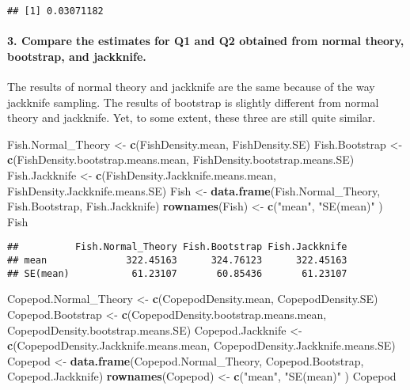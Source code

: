 \documentclass[]{article}
\newenvironment{Shaded}{\begin{snugshade}}{\end{snugshade}}
\newcommand{\KeywordTok}[1]{\textcolor[rgb]{0.13,0.29,0.53}{\textbf{{#1}}}}
\newcommand{\StringTok}[1]{\textcolor[rgb]{0.31,0.60,0.02}{{#1}}}
\newcommand{\NormalTok}[1]{{#1}}
\let\oldparagraph\paragraph
\renewcommand{\paragraph}[1]{\oldparagraph{#1}\mbox{}}
\begin{document}
\begin{verbatim}
## [1] 0.03071182
\end{verbatim}

\paragraph{3. Compare the estimates for Q1 and Q2 obtained from normal
theory, bootstrap, and
jackknife.}\label{compare-the-estimates-for-q1-and-q2-obtained-from-normal-theory-bootstrap-and-jackknife.}

The results of normal theory and jackknife are the same because of the
way jackknife sampling. The results of bootstrap is slightly different
from normal theory and jackknife. Yet, to some extent, these three are
still quite similar.

\begin{Shaded}
\begin{Highlighting}[]
\NormalTok{Fish.Normal_Theory <-}\StringTok{ }\KeywordTok{c}\NormalTok{(FishDensity.mean, FishDensity.SE)}
\NormalTok{Fish.Bootstrap <-}\StringTok{ }\KeywordTok{c}\NormalTok{(FishDensity.bootstrap.means.mean, FishDensity.bootstrap.means.SE)}
\NormalTok{Fish.Jackknife <-}\StringTok{ }\KeywordTok{c}\NormalTok{(FishDensity.Jackknife.means.mean, FishDensity.Jackknife.means.SE)}
\NormalTok{Fish <-}\StringTok{ }\KeywordTok{data.frame}\NormalTok{(Fish.Normal_Theory, Fish.Bootstrap, Fish.Jackknife)}
\KeywordTok{rownames}\NormalTok{(Fish) <-}\StringTok{ }\KeywordTok{c}\NormalTok{(}\StringTok{"mean"}\NormalTok{, }\StringTok{"SE(mean)"} \NormalTok{)}
\NormalTok{Fish}
\end{Highlighting}
\end{Shaded}

\begin{verbatim}
##          Fish.Normal_Theory Fish.Bootstrap Fish.Jackknife
## mean              322.45163      324.76123      322.45163
## SE(mean)           61.23107       60.85436       61.23107
\end{verbatim}

\begin{Shaded}
\begin{Highlighting}[]
\NormalTok{Copepod.Normal_Theory <-}\StringTok{ }\KeywordTok{c}\NormalTok{(CopepodDensity.mean, CopepodDensity.SE)}
\NormalTok{Copepod.Bootstrap <-}\StringTok{ }\KeywordTok{c}\NormalTok{(CopepodDensity.bootstrap.means.mean, CopepodDensity.bootstrap.means.SE)}
\NormalTok{Copepod.Jackknife <-}\StringTok{ }\KeywordTok{c}\NormalTok{(CopepodDensity.Jackknife.means.mean, CopepodDensity.Jackknife.means.SE)}
\NormalTok{Copepod <-}\StringTok{ }\KeywordTok{data.frame}\NormalTok{(Copepod.Normal_Theory, Copepod.Bootstrap, Copepod.Jackknife)}
\KeywordTok{rownames}\NormalTok{(Copepod) <-}\StringTok{ }\KeywordTok{c}\NormalTok{(}\StringTok{"mean"}\NormalTok{, }\StringTok{"SE(mean)"} \NormalTok{)}
\NormalTok{Copepod}
\end{Highlighting}
\end{Shaded}
\end{document}
